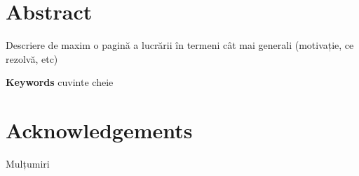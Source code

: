 \chapter*{Abstract}

Descriere de maxim o pagină a lucrării în termeni cât mai generali (motivație, ce rezolvă, etc)

\textbf{Keywords} cuvinte cheie

\chapter*{Acknowledgements}

Mulțumiri 



